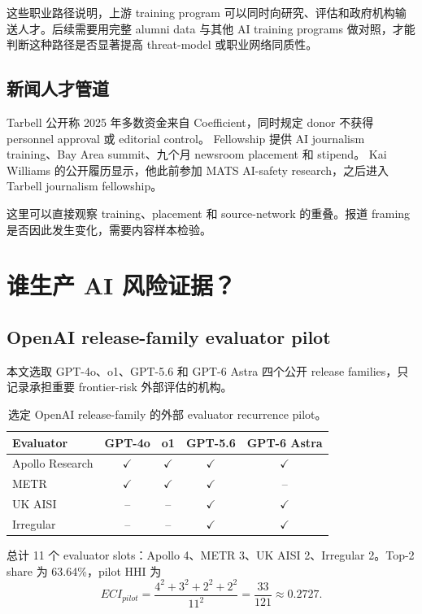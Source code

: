 \documentclass[11pt,twoside]{article}
\begin{document}
这些职业路径说明，上游 training program 可以同时向研究、评估和政府机构输送人才。后续需要用完整 alumni data 与其他 AI training programs 做对照，才能判断这种路径是否显著提高 threat-model 或职业网络同质性。

\subsection{新闻人才管道}
Tarbell 公开称 2025 年多数资金来自 Coefficient，同时规定 donor 不获得 personnel approval 或 editorial control。 Fellowship 提供 AI journalism training、Bay Area summit、九个月 newsroom placement 和 stipend。 Kai Williams 的公开履历显示，他此前参加 MATS AI-safety research，之后进入 Tarbell journalism fellowship。

这里可以直接观察 training、placement 和 source-network 的重叠。报道 framing 是否因此发生变化，需要内容样本检验。

\section{谁生产 AI 风险证据？}
\subsection{OpenAI release-family evaluator pilot}
本文选取 GPT-4o、o1、GPT-5.6 和 GPT-6 Astra 四个公开 release families，只记录承担重要 frontier-risk 外部评估的机构。

\begin{table}[ht]
\centering\small
\begin{tabular}{lcccc}
\toprule
Evaluator & GPT-4o & o1 & GPT-5.6 & GPT-6 Astra \\
\midrule
Apollo Research & $\checkmark$ & $\checkmark$ & $\checkmark$ & $\checkmark$ \\
METR & $\checkmark$ & $\checkmark$ & $\checkmark$ & -- \\
UK AISI & -- & -- & $\checkmark$ & $\checkmark$ \\
Irregular & -- & -- & $\checkmark$ & $\checkmark$ \\
\bottomrule
\end{tabular}
\caption{选定 OpenAI release-family 的外部 evaluator recurrence pilot。}
\end{table}

总计 11 个 evaluator slots：Apollo 4、METR 3、UK AISI 2、Irregular 2。Top-2 share 为 63.64\%，pilot HHI 为
\[
ECI_{pilot}=\frac{4^2+3^2+2^2+2^2}{11^2}=\frac{33}{121}\approx0.2727.
\]
\end{document}
